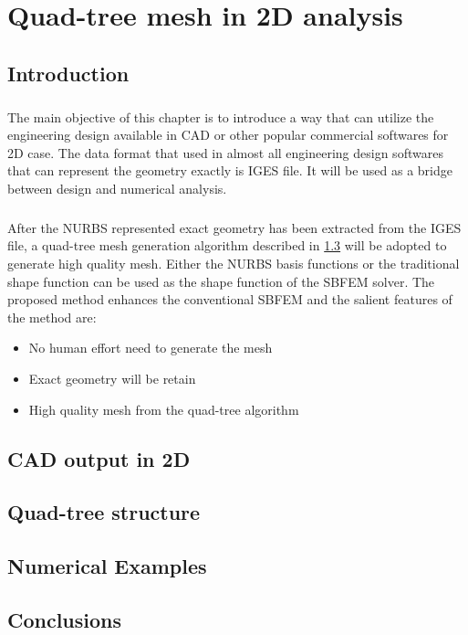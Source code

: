 \chapter{Quad-tree mesh in 2D analysis}

\section{Introduction}
\paragraph{}
The main objective of this chapter is to introduce a way that can utilize the engineering design available in CAD or other popular commercial softwares for 2D case.
The data format that used in almost all engineering design softwares that can represent the geometry exactly is IGES file.
It will be used as a bridge between design and numerical analysis.

\paragraph{}
After the NURBS represented exact geometry has been extracted from the IGES file, a quad-tree mesh generation algorithm described in \ref{qt_sc:quadtree} will be adopted to generate high quality mesh.
Either the NURBS basis functions or the traditional shape function can be used as the shape function of the SBFEM solver.
The proposed method enhances the conventional SBFEM and the salient features of the method are:
    \begin{itemize}
        \item No human effort need to generate the mesh
        \item Exact geometry will be retain
        \item High quality mesh from the quad-tree algorithm
    \end{itemize}
\pagebreak

\section{CAD output in 2D}
\label{qt_sc:iges}


\section{Quad-tree structure}
\label{qt_sc:quadtree}


% 


\section{Numerical Examples}




\section{Conclusions}